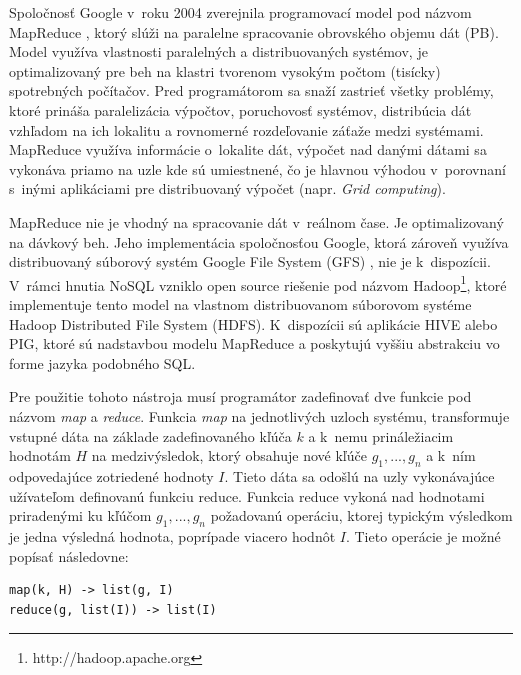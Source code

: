 \documentclass[11pt,twoside,a4paper]{book}
\begin{document}
Spoločnosť Google v~roku 2004 zverejnila programovací model pod názvom MapReduce \cite{dean2008mapreduce}, ktorý slúži na paralelne spracovanie obrovského objemu dát (PB). Model využíva vlastnosti paralelných a distribuovaných systémov, je optimalizovaný pre beh na klastri tvorenom vysokým počtom (tisícky) spotrebných počítačov. Pred programátorom sa snaží zastrieť všetky problémy, ktoré prináša paralelizácia výpočtov, poruchovosť systémov, distribúcia dát vzhľadom na ich lokalitu a rovnomerné rozdeľovanie záťaže medzi systémami. MapReduce využíva informácie o~lokalite dát, výpočet nad danými dátami sa vykonáva priamo na uzle kde sú umiestnené, čo je hlavnou výhodou v~porovnaní s~inými aplikáciami pre distribuovaný výpočet (napr. \emph{Grid computing}). 

MapReduce nie je vhodný na spracovanie dát v~reálnom čase. Je optimalizovaný na dávkový beh. Jeho implementácia spoločnosťou Google, ktorá zároveň využíva distribuovaný súborový systém Google File System (GFS) \cite{ghemawat2003google}, nie je k~dispozícii. V~rámci hnutia NoSQL vzniklo open source riešenie pod názvom Hadoop\footnote{http://hadoop.apache.org}, ktoré implementuje tento model na vlastnom distribuovanom súborovom systéme Hadoop Distributed File System (HDFS). K~dispozícii sú aplikácie HIVE alebo PIG, ktoré sú nadstavbou modelu MapReduce a poskytujú vyššiu abstrakciu vo forme jazyka podobného SQL.


Pre použitie tohoto nástroja musí programátor zadefinovať dve funkcie pod názvom \emph{map} a \emph{reduce}. Funkcia \emph{map} na jednotlivých uzloch systému, transformuje vstupné dáta na základe zadefinovaného kľúča $k$ a k~nemu prináležiacim hodnotám $H$ na medzivýsledok, ktorý obsahuje nové kľúče $g_1,...,g_n$ a k~ním odpovedajúce zotriedené hodnoty $I$. Tieto dáta sa odošlú na uzly vykonávajúce užívateľom definovanú funkciu reduce. Funkcia reduce vykoná nad hodnotami priradenými ku kľúčom $g_1,...,g_n$ požadovanú operáciu, ktorej typickým výsledkom je jedna výsledná hodnota, poprípade viacero hodnôt $I$. Tieto operácie je možné popísať následovne:

\begin{verbatim}
map(k, H) -> list(g, I)
reduce(g, list(I)) -> list(I)
\end{verbatim}
\end{document}
